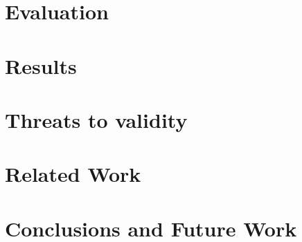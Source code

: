 \documentclass[sigconf]{acmart}
\begin{document}
\section{Evaluation}		
\label{sec:Evaluation}


\section{Results}
\label{sec:ExperimentalResults}



\section{Threats to validity}
\label{sec:Threats}


\section{Related Work}
\label{sec:RelatedWorks}


\section{Conclusions and Future Work}
\label{sec:Conclusions}





\end{document}
